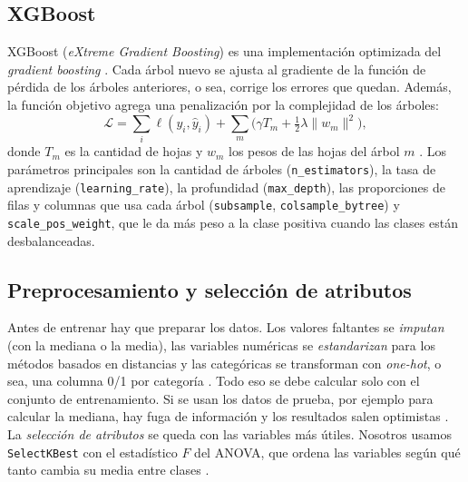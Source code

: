 \documentclass[11pt,a4paper]{article}
\let\citepOriginal\citep
\renewcommand*{\citep}[1]{\textbf{\citepOriginal{#1}}}%
\begin{document}
\subsection{XGBoost}
XGBoost (\textit{eXtreme Gradient Boosting}) es una implementación optimizada del \textit{gradient boosting} \citep{friedman2001,chen2016}. Cada árbol nuevo se ajusta al gradiente de la función de pérdida de los árboles anteriores, o sea, corrige los errores que quedan. Además, la función objetivo agrega una penalización por la complejidad de los árboles:
\[
\mathcal{L}=\sum_i \ell(y_i,\hat y_i)+\sum_m\Big(\gamma T_m+\tfrac12\lambda\lVert w_m\rVert^2\Big),
\]
donde $T_m$ es la cantidad de hojas y $w_m$ los pesos de las hojas del árbol $m$ \citep{chen2016}. Los parámetros principales son la cantidad de árboles (\texttt{n\_estimators}), la tasa de aprendizaje (\texttt{learning\_rate}), la profundidad (\texttt{max\_depth}), las proporciones de filas y columnas que usa cada árbol (\texttt{subsample}, \texttt{colsample\_bytree}) y \texttt{scale\_pos\_weight}, que le da más peso a la clase positiva cuando las clases están desbalanceadas.

\subsection{Preprocesamiento y selección de atributos}
Antes de entrenar hay que preparar los datos. Los valores faltantes se \textit{imputan} (con la mediana o la media), las variables numéricas se \textit{estandarizan} para los métodos basados en distancias y las categóricas se transforman con \textit{one-hot}, o sea, una columna 0/1 por categoría \citep{james2013}. Todo eso se debe calcular solo con el conjunto de entrenamiento. Si se usan los datos de prueba, por ejemplo para calcular la mediana, hay fuga de información y los resultados salen optimistas \citep{hastie2009}. La \textit{selección de atributos} se queda con las variables más útiles. Nosotros usamos \texttt{SelectKBest} con el estadístico $F$ del ANOVA, que ordena las variables según qué tanto cambia su media entre clases \citep{guyon2003}.
\end{document}
